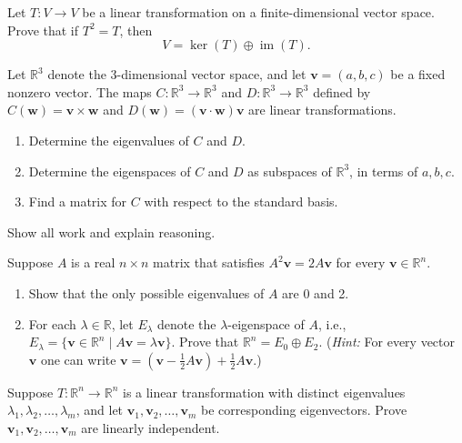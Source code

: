 \documentclass[11pt,twoside,openany]{memoir}
\begin{document}
        \begin{exercise}
        Let $T: V \to V$ be a linear transformation on a finite-dimensional vector space. Prove that if $T^2 = T$, then
        \[
        V = \ker(T) \oplus \operatorname{im}(T).
        \]
        \end{exercise}
        
        \begin{exercise}
        Let $\mathbb{R}^3$ denote the $3$-dimensional vector space, and let $\mathbf{v}=(a,b,c)$ be a fixed nonzero vector. The maps $C: \mathbb{R}^3 \to \mathbb{R}^3$ and $D: \mathbb{R}^3 \to \mathbb{R}^3$ defined by $C(\mathbf{w}) = \mathbf{v} \times \mathbf{w}$ and $D(\mathbf{w}) = (\mathbf{v} \cdot \mathbf{w}) \mathbf{v}$ are linear transformations.
        \begin{enumerate}[label=(\alph*)]
            \item Determine the eigenvalues of $C$ and $D$.
            \item Determine the eigenspaces of $C$ and $D$ as subspaces of $\mathbb{R}^3$, in terms of $a, b, c$.
            \item Find a matrix for $C$ with respect to the standard basis.
        \end{enumerate}
        Show all work and explain reasoning.
        \end{exercise}
        
        \begin{exercise}
        Suppose $A$ is a real $n \times n$ matrix that satisfies $A^2 \mathbf{v} = 2 A \mathbf{v}$ for every $\mathbf{v} \in \mathbb{R}^n$.
        \begin{enumerate}[label=(\alph*)]
            \item Show that the only possible eigenvalues of $A$ are 0 and 2.
            \item For each $\lambda \in \mathbb{R}$, let $E_\lambda$ denote the $\lambda$-eigenspace of $A$, i.e., $E_\lambda = \{ \mathbf{v} \in \mathbb{R}^n \mid A \mathbf{v} = \lambda \mathbf{v} \}$. Prove that $\mathbb{R}^n = E_0 \oplus E_2$. (\textit{Hint:} For every vector $\mathbf{v}$ one can write $\mathbf{v} = (\mathbf{v} - \frac{1}{2} A \mathbf{v}) + \frac{1}{2} A \mathbf{v}$.)
        \end{enumerate}
        \end{exercise}
        
        \begin{exercise}
        Suppose $T: \mathbb{R}^n \to \mathbb{R}^n$ is a linear transformation with distinct eigenvalues $\lambda_1, \lambda_2, \ldots, \lambda_m$, and let $\mathbf{v}_1, \mathbf{v}_2, \ldots, \mathbf{v}_m$ be corresponding eigenvectors. Prove $\mathbf{v}_1, \mathbf{v}_2, \ldots, \mathbf{v}_m$ are linearly independent.
        \end{exercise}
        
\end{document}
